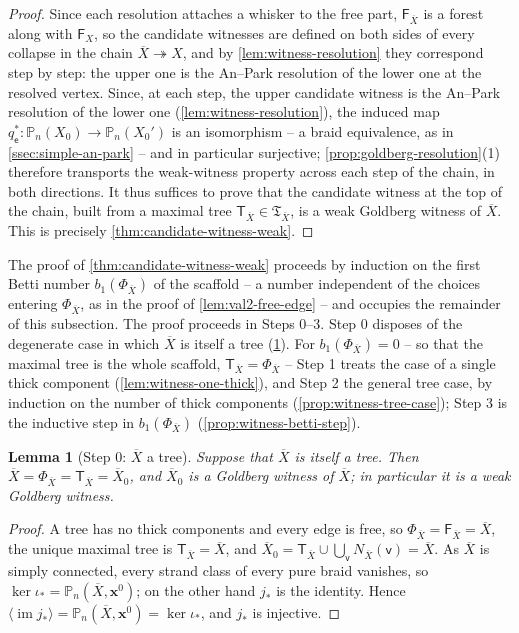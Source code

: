\documentclass[reqno]{amsart}
\newtheorem{lemma}[theorem]{Lemma}
\theoremstyle{definition}
\newcommand\bfx{\mathbf{x}}
\newcommand\sfT{\mathsf{T}}
\newcommand\sfe{\mathsf{e}}
\newcommand\sfv{\mathsf{v}}
\newcommand{\PB}{\mathbb{P}}
\newcommand{\im}{\operatorname{im}}
\newcommand{\co}[1]{\mathopen{\langle}#1\mathclose{\rangle}} %
\newcommand{\base}{\bfx^0}
\renewcommand{\bar}{\overline}
\numberwithin{equation}{section}
\begin{document}
\begin{proof}
Since each resolution attaches a whisker to the free part,
\(\mathsf{F}_{\bar X}\) is a forest along with \(\mathsf{F}_X\),
so the candidate witnesses are defined on both sides of every
collapse in the chain \(\bar X\twoheadrightarrow X\), and by
\cref{lem:witness-resolution} they correspond step by step: the
upper one is the An--Park resolution of the lower one at the
resolved vertex. Since, at each step, the upper candidate witness is the
An--Park resolution of the lower one
(\cref{lem:witness-resolution}), the induced map
\(q_\sfe^\ast\colon\PB_n(X_0)\to\PB_n(X_0')\) is an isomorphism --
a braid equivalence, as in \cref{ssec:simple-an-park} -- and in
particular surjective; \cref{prop:goldberg-resolution}(1)
therefore transports the weak-witness property across each step
of the chain, in both directions. It thus suffices to prove that
the candidate witness at the top of the chain, built from a
maximal tree \(\sfT_{\bar X}\in\mathfrak{T}_{\bar X}\), is a weak
Goldberg witness of \(\bar X\). This is precisely
\cref{thm:candidate-witness-weak}.
\end{proof}

The proof of \cref{thm:candidate-witness-weak} proceeds by
induction on the first Betti number \(b_1(\Phi_{\bar X})\) of
the scaffold -- a number independent of the choices entering
\(\Phi_{\bar X}\), as in the proof of
\cref{lem:val2-free-edge} -- and occupies the remainder of this
subsection. The proof proceeds in Steps 0--3. Step 0 disposes of
the degenerate case in which \(\bar X\) is itself a tree
(\cref{lem:witness-step0}). For \(b_1(\Phi_{\bar X})=0\) -- so
that the maximal tree is the whole scaffold,
\(\sfT_{\bar X}=\Phi_{\bar X}\) -- Step 1 treats the case of a
single thick component (\cref{lem:witness-one-thick}), and
Step 2 the general tree case, by induction on the number of
thick components (\cref{prop:witness-tree-case}); Step 3 is the
inductive step in \(b_1(\Phi_{\bar X})\)
(\cref{prop:witness-betti-step}).

\begin{lemma}[Step 0: \(\bar X\) a tree]
\label{lem:witness-step0}
Suppose that \(\bar X\) is itself a tree. Then
\(\bar X=\Phi_{\bar X}=\sfT_{\bar X}=\bar X_0\), and \(\bar X_0\)
is a Goldberg witness of \(\bar X\); in particular it is a weak
Goldberg witness.
\end{lemma}

\begin{proof}
A tree has no thick components and every edge is free, so
\(\Phi_{\bar X}=\mathsf{F}_{\bar X}=\bar X\), the unique maximal
tree is \(\sfT_{\bar X}=\bar X\), and
\(\bar X_0=\sfT_{\bar X}\cup\bigcup_\sfv N_{\bar X}(\sfv)=\bar X\). As
\(\bar X\) is simply connected, every strand class of every pure
braid vanishes, so \(\ker\iota_\ast=\PB_n(\bar X,\base)\); on
the other hand \(j_\ast\) is the identity. Hence
\(\co{\im j_\ast}=\PB_n(\bar X,\base)=\ker\iota_\ast\), and
\(j_\ast\) is injective.
\end{proof}
\end{document}
